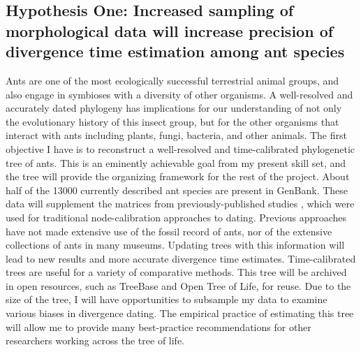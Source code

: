 \documentclass[]{article}
\begin{document}
\subsection*{Hypothesis One: Increased sampling of morphological data will increase precision of divergence time estimation among ant species}

Ants are one of the most ecologically successful terrestrial animal groups, and also engage in symbioses with a diversity of other organisms. A well-resolved and accurately dated phylogeny has implications for our understanding of not only the evolutionary history of this insect group, but for the other organisms that interact with ants including plants, fungi, bacteria, and other animals. The first objective I have is to reconstruct a well-resolved and time-calibrated phylogenetic tree of ants. This is an eminently achievable goal from my present skill set, and the tree will provide the organizing framework for the rest of the project. About half of the 13000 currently described ant species are present in GenBank. These data will supplement the matrices from previously-published studies \citep{brady2006evaluating, moreau2006phylogeny, moreau2013testing}, which were used for traditional node-calibration approaches to dating. Previous approaches have not made extensive use of the fossil record of ants, nor of the extensive collections of ants in many museums. Updating trees with this information will lead to new results and more accurate divergence time estimates. Time-calibrated trees are useful for a variety of comparative methods. This tree will be archived in open resources, such as TreeBase and Open Tree of Life, for reuse. Due to the size of the tree, I will have opportunities to subsample my data to examine various biases in divergence dating. The empirical practice of estimating this tree will allow me to provide many best-practice recommendations for other researchers working across the tree of life.\par
\end{document}
